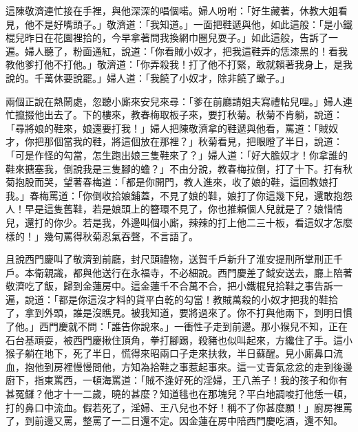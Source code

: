 這陳敬濟連忙接在手裡，與他深深的唱個喏。婦人吩咐：「好生藏著，休教大姐看見，他不是好嘴頭子。」敬濟道：「我知道。」一面把鞋遞與他，如此這般：「是小鐵棍兒昨日在花園裡拾的，今早拿著問我換網巾圈兒耍子。」如此這般，告訴了一遍。婦人聽了，粉面通紅，說道：「你看賊小奴才，把我這鞋弄的恁漆黑的！看我教他爹打他不打他。」敬濟道：「你弄殺我！打了他不打緊，敢就賴著我身上，是我說的。千萬休要說罷。」婦人道：「我饒了小奴才，除非饒了蠍子。」

兩個正說在熱鬧處，忽聽小廝來安兒來尋：「爹在前廳請姐夫寫禮帖兒哩。」婦人連忙攛掇他出去了。下的樓來，教春梅取板子來，要打秋菊。秋菊不肯躺，說道：「尋將娘的鞋來，娘還要打我！」婦人把陳敬濟拿的鞋遞與他看，罵道：「賊奴才，你把那個當我的鞋，將這個放在那裡？」秋菊看見，把眼瞪了半日，說道：「可是作怪的勾當，怎生跑出娘三隻鞋來了？」婦人道：「好大膽奴才！你拿誰的鞋來搪塞我，倒說我是三隻腳的蟾？」不由分說，教春梅拉倒，打了十下。打有秋菊抱股而哭，望著春梅道：「都是你開門，教人進來，收了娘的鞋，這回教娘打我。」春梅罵道：「你倒收拾娘鋪蓋，不見了娘的鞋，娘打了你這幾下兒，還敢抱怨人！早是這隻舊鞋，若是娘頭上的簪環不見了，你也推賴個人兒就是了？娘惜情兒，還打的你少。若是我，外邊叫個小廝，辣辣的打上他二三十板，看這奴才怎麼樣的！」幾句罵得秋菊忍氣吞聲，不言語了。

且說西門慶叫了敬濟到前廳，封尺頭禮物，送賀千戶新升了淮安提刑所掌刑正千戶。本衛親識，都與他送行在永福寺，不必細說。西門慶差了鉞安送去，廳上陪著敬濟吃了飯，歸到金蓮房中。這金蓮千不合萬不合，把小鐵棍兒拾鞋之事告訴一遍，說道：「都是你這沒才料的貨平白乾的勾當！教賊萬殺的小奴才把我的鞋拾了，拿到外頭，誰是沒瞧見。被我知道，要將過來了。你不打與他兩下，到明日慣了他。」西門慶就不問：「誰告你說來。」一衝性子走到前邊。那小猴兒不知，正在石台基頑耍，被西門慶揪住頂角，拳打腳踢，殺豬也似叫起來，方纔住了手。這小猴子躺在地下，死了半日，慌得來昭兩口子走來扶救，半日蘇醒。見小廝鼻口流血，抱他到房裡慢慢問他，方知為拾鞋之事惹起事來。這一丈青氣忿忿的走到後邊廚下，指東罵西，一頓海罵道：「賊不逢好死的淫婦，王八羔子！我的孩子和你有甚冤讎？他才十一二歲，曉的甚麼？知道毴也在那塊兒？平白地調唆打他恁一頓，打的鼻口中流血。假若死了，淫婦、王八兒也不好！稱不了你甚麼願！」廚房裡罵了，到前邊又罵，整罵了一二日還不定。因金蓮在房中陪西門慶吃酒，還不知。

